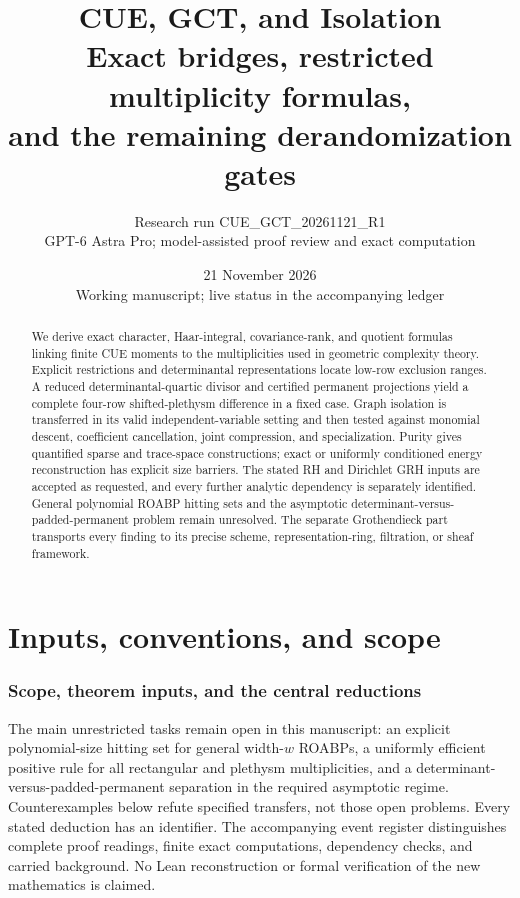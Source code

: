 \documentclass[11pt,a4paper]{article}
\title{CUE, GCT, and Isolation\\Exact bridges, restricted multiplicity formulas,\\and the remaining derandomization gates}
\author{Research run CUE\_GCT\_20261121\_R1\\GPT-6 Astra Pro; model-assisted proof review and exact computation}
\date{21 November 2026\\Working manuscript; live status in the accompanying ledger}
\theoremstyle{definition}\newtheorem{definition}{Definition}
\begin{document}
\maketitle
\begin{abstract}
We derive exact character, Haar-integral, covariance-rank, and quotient formulas linking finite CUE moments to the multiplicities used in geometric complexity theory. Explicit restrictions and determinantal representations locate low-row exclusion ranges. A reduced determinantal-quartic divisor and certified permanent projections yield a complete four-row shifted-plethysm difference in a fixed case. Graph isolation is transferred in its valid independent-variable setting and then tested against monomial descent, coefficient cancellation, joint compression, and specialization. Purity gives quantified sparse and trace-space constructions; exact or uniformly conditioned energy reconstruction has explicit size barriers. The stated RH and Dirichlet GRH inputs are accepted as requested, and every further analytic dependency is separately identified. General polynomial ROABP hitting sets and the asymptotic determinant-versus-padded-permanent problem remain unresolved. The separate Grothendieck part transports every finding to its precise scheme, representation-ring, filtration, or sheaf framework.
\end{abstract}
\tableofcontents\clearpage
\part{Inputs, conventions, and scope}
\section{Scope, theorem inputs, and the central reductions}

The main unrestricted tasks remain open in this manuscript: an explicit polynomial-size hitting set for general width-$w$ ROABPs, a uniformly efficient positive rule for all rectangular and plethysm multiplicities, and a determinant-versus-padded-permanent separation in the required asymptotic regime. Counterexamples below refute specified transfers, not those open problems. Every stated deduction has an identifier. The accompanying event register distinguishes complete proof readings, finite exact computations, dependency checks, and carried background. No Lean reconstruction or formal verification of the new mathematics is claimed.
\end{document}
